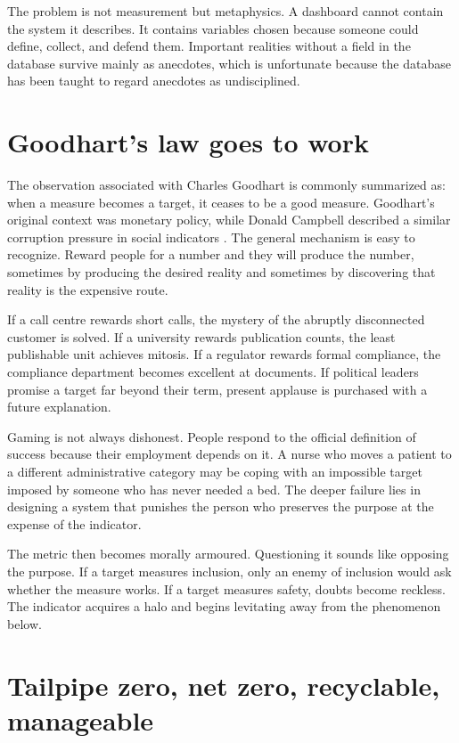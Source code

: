 \documentclass[12pt,a4paper]{book}
\begin{document}
The problem is not measurement but metaphysics.  A dashboard cannot contain
the system it describes.  It contains variables chosen because someone could
define, collect, and defend them.  Important realities without a field in the
database survive mainly as anecdotes, which is unfortunate because the
database has been taught to regard anecdotes as undisciplined.

\section{Goodhart's law goes to work}

The observation associated with Charles Goodhart is commonly summarized as:
when a measure becomes a target, it ceases to be a good measure.  Goodhart's
original context was monetary policy, while Donald Campbell described a
similar corruption pressure in social indicators
\cite{GoodhartMonetaryManagement1975,CampbellSocialIndicators1976}.  The
general mechanism is easy to recognize.  Reward people for a number and they
will produce the number, sometimes by producing the desired reality and
sometimes by discovering that reality is the expensive route.

If a call centre rewards short calls, the mystery of the abruptly disconnected
customer is solved.  If a university rewards publication counts, the least
publishable unit achieves mitosis.  If a regulator rewards formal compliance,
the compliance department becomes excellent at documents.  If political
leaders promise a target far beyond their term, present applause is purchased
with a future explanation.

Gaming is not always dishonest.  People respond to the official definition of
success because their employment depends on it.  A nurse who moves a patient
to a different administrative category may be coping with an impossible
target imposed by someone who has never needed a bed.  The deeper failure lies
in designing a system that punishes the person who preserves the purpose at
the expense of the indicator.

The metric then becomes morally armoured.  Questioning it sounds like opposing
the purpose.  If a target measures inclusion, only an enemy of inclusion would
ask whether the measure works.  If a target measures safety, doubts become
reckless.  The indicator acquires a halo and begins levitating away from the
phenomenon below.

\section{Tailpipe zero, net zero, recyclable, manageable}
\end{document}
